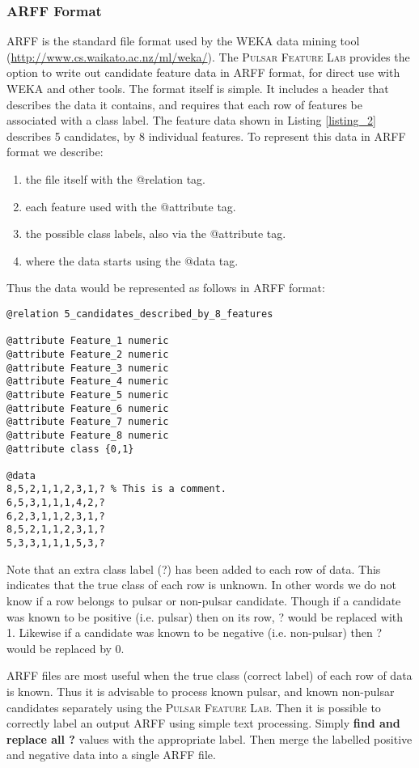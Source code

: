 \documentclass[twoside,a4paper]{refart}
\begin{document}
\subsubsection{ARFF Format}
ARFF is the standard file format used by the WEKA data mining tool (\url{http://www.cs.waikato.ac.nz/ml/weka/}). The \textsc{Pulsar Feature Lab} provides the option to write out candidate feature data in ARFF format, for direct use with WEKA and other tools. The format itself is simple. It includes a header that describes the data it contains, and requires that each row of features be associated with a class label. The feature data shown in Listing \ref{listing_2} describes 5 candidates, by 8 individual features. To represent this data in ARFF format we describe:
\begin{enumerate}
\item the file itself with the @relation tag.
\item each feature used with the @attribute tag. 
\item the possible class labels, also via the @attribute tag.
\item where the data starts using the @data tag.
\end{enumerate}            
Thus the data would be represented as follows in ARFF format:
\begin{lstlisting}[caption={Feature data output in ARFF format.}]
@relation 5_candidates_described_by_8_features

@attribute Feature_1 numeric
@attribute Feature_2 numeric
@attribute Feature_3 numeric
@attribute Feature_4 numeric
@attribute Feature_5 numeric
@attribute Feature_6 numeric
@attribute Feature_7 numeric
@attribute Feature_8 numeric
@attribute class {0,1}

@data
8,5,2,1,1,2,3,1,? % This is a comment.
6,5,3,1,1,1,4,2,?
6,2,3,1,1,2,3,1,?
8,5,2,1,1,2,3,1,?
5,3,3,1,1,1,5,3,?
\end{lstlisting}
Note that an extra class label (?) has been added to each row of data. This indicates that the true class of each row is unknown. In other words we do not know if a row belongs to pulsar or non-pulsar candidate. Though if a candidate was known to be positive (i.e. pulsar) then on its row, ? would be replaced with 1. Likewise if a candidate was known to be negative (i.e. non-pulsar) then ? would be replaced by 0.

ARFF files are most useful when the true class (correct label) of each row of data is known. Thus it is advisable to process known pulsar, and known non-pulsar candidates separately using the \textsc{Pulsar Feature Lab}. Then it is possible to correctly label an output ARFF using simple text processing. Simply \textbf{find and replace all ?} values with the appropriate label. Then merge the labelled positive and negative data into a single ARFF file.\newpage
\end{document}
